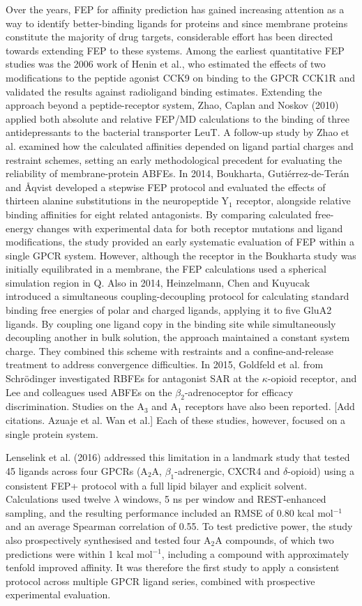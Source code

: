 Over the years, FEP for affinity prediction has gained increasing attention as a way to identify better-binding ligands for proteins and since membrane proteins constitute the majority of drug targets, considerable effort has been directed towards extending FEP to these systems. Among the earliest quantitative FEP studies was the 2006 work of Henin et al., who estimated the effects of two modifications to the peptide agonist CCK9 on binding to the GPCR CCK1R and validated the results against radioligand binding estimates. Extending the approach beyond a peptide-receptor system, Zhao, Caplan and Noskov (2010) applied both absolute and relative FEP/MD calculations to the binding of three antidepressants to the bacterial transporter LeuT. A follow-up study by Zhao et al. examined how the calculated affinities depended on ligand partial charges and restraint schemes, setting an early methodological precedent for evaluating the reliability of membrane-protein ABFEs. In 2014, Boukharta, Gutiérrez-de-Terán and Åqvist developed a stepwise FEP protocol and evaluated the effects of thirteen alanine substitutions in the neuropeptide Y$_1$ receptor, alongside relative binding affinities for eight related antagonists. By comparing calculated free-energy changes with experimental data for both receptor mutations and ligand modifications, the study provided an early systematic evaluation of FEP within a single GPCR system. However, although the receptor in the Boukharta study was initially equilibrated in a membrane, the FEP calculations used a spherical simulation region in Q. Also in 2014, Heinzelmann, Chen and Kuyucak introduced a simultaneous coupling-decoupling protocol for calculating standard binding free energies of polar and charged ligands, applying it to five GluA2 ligands. By coupling one ligand copy in the binding site while simultaneously decoupling another in bulk solution, the approach maintained a constant system charge. They combined this scheme with restraints and a confine-and-release treatment to address convergence difficulties. In 2015, Goldfeld et al. from Schrödinger investigated RBFEs for antagonist SAR at the $\kappa$-opioid receptor, and Lee and colleagues used ABFEs on the $\beta_2$-adrenoceptor for efficacy discrimination. Studies on the A$_3$ and A$_1$ receptors have also been reported. [Add citations. Azuaje et al. Wan et al.] Each of these studies, however, focused on a single protein system.

Lenselink et al. (2016) addressed this limitation in a landmark study that tested 45 ligands across four GPCRs (A$_2$A, $\beta_1$-adrenergic, CXCR4 and $\delta$-opioid) using a consistent FEP+ protocol with a full lipid bilayer and explicit solvent. Calculations used twelve $\lambda$ windows, 5 ns per window and REST-enhanced sampling, and the resulting performance included an RMSE of 0.80 kcal mol$^{-1}$ and an average Spearman correlation of 0.55. To test predictive power, the study also prospectively synthesised and tested four A$_2$A compounds, of which two predictions were within 1 kcal mol$^{-1}$, including a compound with approximately tenfold improved affinity. It was therefore the first study to apply a consistent protocol across multiple GPCR ligand series, combined with prospective experimental evaluation.

